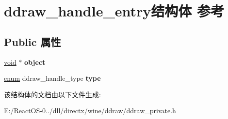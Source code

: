 \hypertarget{structddraw__handle__entry}{}\section{ddraw\+\_\+handle\+\_\+entry结构体 参考}
\label{structddraw__handle__entry}
\subsection*{Public 属性}
\begin{DoxyCompactItemize}
\item 
\mbox{\label{structddraw__handle__entry_aab9321048ee5a6ac90a1dd97ea703583}} 
\hyperlink{interfacevoid}{void} $\ast$ {\bfseries object}
\item 
\mbox{\label{structddraw__handle__entry_a854a2ee05ecc5e9cb4858798d7cdd18e}} 
\hyperlink{interfaceenum}{enum} ddraw\+\_\+handle\+\_\+type {\bfseries type}
\end{DoxyCompactItemize}


该结构体的文档由以下文件生成\+:\begin{DoxyCompactItemize}
\item 
E\+:/\+React\+O\+S-\/0../dll/directx/wine/ddraw/ddraw\+\_\+private.\+h\end{DoxyCompactItemize}
